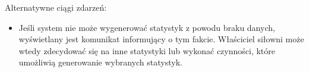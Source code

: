 {Alternatywne ciągi zdarzeń:}

\begin{itemize}
\tightlist
\item
  {Jeśli system nie może wygenerować statystyk z powodu braku danych,
  wyświetlany jest komunikat informujący o tym fakcie. Właściciel
  siłowni może wtedy zdecydować się na inne statystyki lub wykonać
  czynności, które umożliwią generowanie wybranych statystyk.}
\end{itemize}